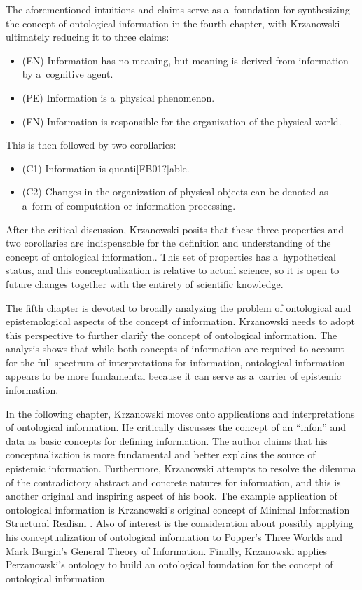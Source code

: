 The aforementioned intuitions and claims serve as a~foundation for synthesizing the concept of ontological information in the fourth chapter, with Krzanowski ultimately reducing it to three claims:

\begin{itemize}
\item (EN) Information has no meaning, but meaning is derived from information by a~cognitive agent.
\item (PE) Information is a~physical phenomenon.
\item (FN) Information is responsible for the organization of the physical world.
\end{itemize}
This is then followed by two corollaries:

\begin{itemize}
\item (C1) Information is quanti[FB01?]able.
\item (C2) Changes in the organization of physical objects can be denoted as a~form of computation or information processing.
\end{itemize}
After the critical discussion, Krzanowski posits that these three properties and two corollaries are indispensable for the definition and understanding of the concept of ontological information.. This set of properties has a~hypothetical status, and this conceptualization is relative to actual science, so it is open to future changes together with the entirety of scientific knowledge.

The fifth chapter is devoted to broadly analyzing the problem of ontological and epistemological aspects of the concept of information. Krzanowski needs to adopt this perspective to further clarify the concept of ontological information. The analysis shows that while both concepts of information are required to account for the full spectrum of interpretations for information, ontological information appears to be more fundamental because it can serve as a~carrier of epistemic information.

In the following chapter, Krzanowski moves onto applications and interpretations of ontological information. He critically discusses the concept of an ``infon'' and data as basic concepts for defining information. The author claims that his conceptualization is more fundamental and better explains the source of epistemic information. Furthermore, Krzanowski attempts to resolve the dilemma of the contradictory abstract and concrete natures for information, and this is another original and inspiring aspect of his book. The example application of ontological information is Krzanowski's original concept of Minimal Information Structural Realism
\parencite[first introduced in][]{krzanowski_minimal_2017}. %
 Also of interest is the consideration about possibly applying his conceptualization of ontological information to Popper's Three Worlds and Mark Burgin's General Theory of Information. Finally, Krzanowski applies Perzanowski's ontology to build an ontological foundation for the concept of ontological information.

